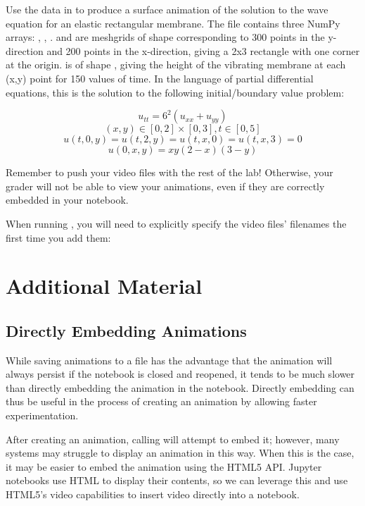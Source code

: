 \begin{problem}
Use the data in  to produce a surface animation of the solution to the wave equation for an elastic rectangular membrane.
The file contains three NumPy arrays: , , .
 and  are meshgrids of shape  corresponding to 300 points in the y-direction and 200 points in the x-direction, giving a 2x3 rectangle with one corner at the origin.
 is of shape , giving the height of the vibrating membrane at each (x,y) point for 150 values of time. 
In the language of partial differential equations, this is the solution to the following initial/boundary value problem:

$$u_{tt} = 6^2(u_{xx}+u_{yy})$$
$$(x,y) \in [0,2]\times[0,3], t \in [0,5]$$
$$u(t,0,y)=u(t,2,y)=u(t,x,0)=u(t,x,3) = 0$$
$$u(0,x,y) = xy(2-x)(3-y)$$
\end{problem}
\begin{warn}
Remember to push your video files with the rest of the lab!
Otherwise, your grader will not be able to view your animations, even if they are correctly embedded in your notebook.

When running , you will need to explicitly specify the video files' filenames the first time you add them: 
\end{warn}

\newpage
\section*{Additional Material}
\subsection*{Directly Embedding Animations}
While saving animations to a file has the advantage that the animation will always persist if the notebook is closed and reopened, it tends to be much slower than directly embedding the animation in the notebook.
Directly embedding can thus be useful in the process of creating an animation by allowing faster experimentation.

After creating an animation, calling  will attempt to embed it; however, many systems may struggle to display an animation in this way.
When this is the case, it may be easier to embed the animation using the HTML5 API. 
Jupyter notebooks use HTML to display their contents, so we can leverage this and use HTML5's video capabilities to insert video directly into a notebook.

